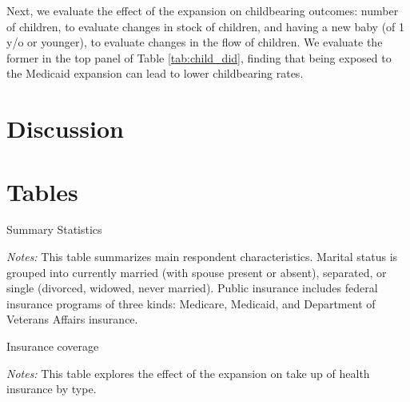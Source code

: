 \documentclass{article}
\begin{document}
Next, we evaluate the effect of the expansion on childbearing outcomes: number of children, to evaluate changes in stock of children, and having a new baby (of 1 y/o or younger), to evaluate changes in the flow of children. We evaluate the former in the top panel of Table \ref{tab:child_did}, finding that being exposed to the Medicaid expansion can lead to lower childbearing rates.





\section{Discussion}


\newpage


\newpage
\section{Tables}

\newpage
\begin{table}[h!]
\begin{centering}
\singlespacing
\caption{Summary Statistics}
\label{tab:sumstat}
\end{centering}
\begin{spacing}{1}
\begin{footnotesize}

\textit{Notes:} This table summarizes main respondent characteristics. Marital status is grouped into currently married (with spouse present or absent), separated, or single (divorced, widowed, never married). Public insurance includes federal insurance programs of three kinds: Medicare, Medicaid, and Department of Veterans Affairs insurance.
\end{footnotesize}
\end{spacing}
\end{table}

\newpage
\begin{table}[h!]
\begin{centering}
\singlespacing
\caption{Insurance coverage}
\label{tab:cov}
\end{centering}
\begin{spacing}{1}
\begin{footnotesize}

\textit{Notes:} This table explores the effect of the expansion on take up of health insurance by type.
\end{footnotesize}
\end{spacing}
\end{table}
\end{document}
